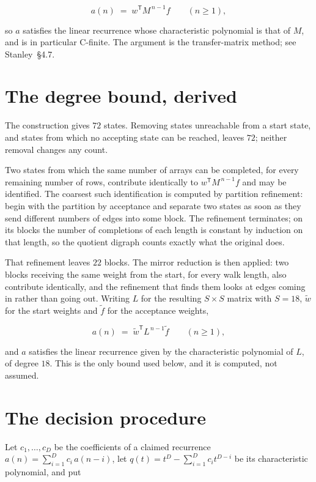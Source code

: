 \documentclass[11pt]{article}
\theoremstyle{definition}
\begin{document}
\[a(n) \;=\; w^{\mathsf T} M^{\,n-1} f \qquad (n \ge 1),\]

so $a$ satisfies the linear recurrence whose characteristic polynomial is that of $M$, and is in particular C-finite. The argument is the transfer-matrix method; see Stanley~\S4.7.

\section{The degree bound, derived}

The construction gives $72$ states. Removing states unreachable from a start state, and states from which no accepting state can be reached, leaves $72$; neither removal changes any count.

Two states from which the same number of arrays can be completed, for every remaining number of rows, contribute identically to $w^{\mathsf T}M^{\,n-1}f$ and may be identified. The coarsest such identification is computed by partition refinement: begin with the partition by acceptance and separate two states as soon as they send different numbers of edges into some block. The refinement terminates; on its blocks the number of completions of each length is constant by induction on that length, so the quotient digraph counts exactly what the original does.

That refinement leaves $22$ blocks. The mirror reduction is then applied: two blocks receiving the same weight from the start, for every walk length, also contribute identically, and the refinement that finds them looks at edges coming in rather than going out. Writing $L$ for the resulting $S \times S$ matrix with $S = 18$, $\tilde w$ for the start weights and $\tilde f$ for the acceptance weights,

\[a(n) \;=\; \tilde w^{\mathsf T} L^{\,n-1} \tilde f \qquad (n \ge 1),\]

and $a$ satisfies the linear recurrence given by the characteristic polynomial of $L$, of degree $18$. This is the only bound used below, and it is computed, not assumed.

\section{The decision procedure}

Let $c_1,\dots,c_D$ be the coefficients of a claimed recurrence $a(n) = \sum_{i=1}^{D} c_i\,a(n-i)$, let $q(t) = t^{D} - \sum_{i=1}^{D} c_i t^{D-i}$ be its characteristic polynomial, and put
\end{document}
